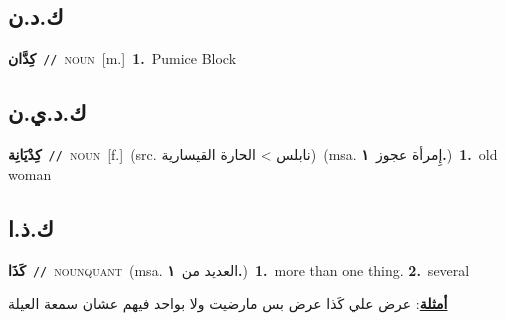 \documentclass[10pt,a4paper,twoside]{article} %
\begin{document}
\begin{multicols}{2}
\vspace{-3mm}
\subsection*{\color{blue}\foreignlanguage{arabic}{ك.د.ن}\color{blue}{}} 

{\setlength\topsep{0pt}\textbf{\foreignlanguage{arabic}{كِدَّان}}\ {\color{gray}\texttt{//}\color{black}}\ \textsc{noun}\ [m.]\ \textbf{1.}~Pumice Block\ } \vspace{2mm}

\vspace{-3mm}
\subsection*{\color{blue}\foreignlanguage{arabic}{ك.د.ي.ن}\color{blue}{}} 

{\setlength\topsep{0pt}\textbf{\foreignlanguage{arabic}{كِدْيَانِة}}\ {\color{gray}\texttt{//}\color{black}}\ \textsc{noun}\ [f.]\ (src. \color{gray}\foreignlanguage{arabic}{نابلس > الحارة القيسارية}\color{black})\ \color{gray}(msa. \foreignlanguage{arabic}{إِمرأة عجوز}~\foreignlanguage{arabic}{\textbf{١.}})\color{black}\ \textbf{1.}~old woman\ } \vspace{2mm}

\vspace{-3mm}
\subsection*{\color{blue}\foreignlanguage{arabic}{ك.ذ.ا}\color{blue}{ (ntws)}} 

{\setlength\topsep{0pt}\textbf{\foreignlanguage{arabic}{كَذَا}}\ {\color{gray}\texttt{//}\color{black}}\ \textsc{noun\textunderscore quant}\ \color{gray}(msa. \foreignlanguage{arabic}{العديد من}~\foreignlanguage{arabic}{\textbf{١.}})\color{black}\ \textbf{1.}~more than one thing.  \textbf{2.}~several\  \begin{flushright}\color{gray}\foreignlanguage{arabic}{\textbf{\underline{\foreignlanguage{arabic}{أمثلة}}}: عرض علي كَذا عرض بس مارضيت ولا بواحد فيهم عشان سمعة العيلة}\end{flushright}\color{black}} \vspace{2mm}


\end{multicols}
\end{document}
